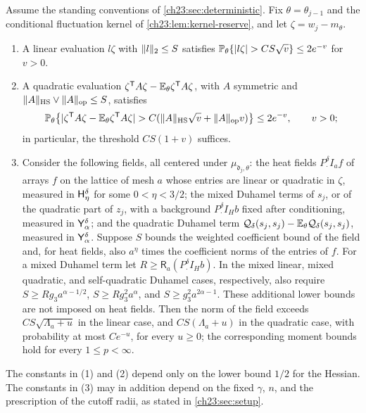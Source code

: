 \begin{lemma}\label{ch23:lem:input-maxima}
Assume the standing conventions of \cref{ch23:sec:deterministic}. Fix $\theta=\theta_{j-1}$ and the conditional fluctuation kernel of \cref{ch23:lem:kernel-reserve}, and let $\zeta=w_j-m_\theta$.
\begin{enumerate}
\item A linear evaluation $l\zeta$ with $\lVert l\rVert_2\le S$ satisfies $\mathbb P_\theta\{\lvert l\zeta\rvert>CS\sqrt v\}\le2e^{-v}$ for $v>0$.
\item A quadratic evaluation $\zeta^{\mathsf T}A\zeta-\mathbb E_\theta\zeta^{\mathsf T}A\zeta$, with $A$ symmetric and $\lVert A\rVert_{\mathrm{HS}}\vee\lVert A\rVert_{\mathrm{op}}\le S$, satisfies
\[
 \mathbb P_\theta\bigl\{\lvert \zeta^{\mathsf T}A\zeta-\mathbb E_\theta\zeta^{\mathsf T}A\zeta\rvert>C(\lVert A\rVert_{\mathrm{HS}}\sqrt v+\lVert A\rVert_{\mathrm{op}}v)\bigr\}\le2e^{-v},\qquad v>0;
\]
in particular, the threshold $CS(1+v)$ suffices.
\item Consider the following fields, all centered under $\mu_{\mathfrak d_j,\theta}$: the heat fields $P_\cdot^\delta I_af$ of arrays $f$ on the lattice of mesh $a$ whose entries are linear or quadratic in $\zeta$, measured in $\mathsf H_{\eta}^{\delta}$ for some $0<\eta<3/2$; the mixed Duhamel terms of $s_j$, or of the quadratic part of $z_j$, with a background $P_\cdot^\delta I_Hb$ fixed after conditioning, measured in $\mathsf Y_{\alpha}^{\delta}$; and the quadratic Duhamel term $\mathcal Q_\delta(s_j,s_j)-\mathbb E_\theta\mathcal Q_\delta(s_j,s_j)$, measured in $\mathsf Y_{\alpha}^{\delta}$. Suppose $S$ bounds the weighted coefficient bound of the field and, for heat fields, also $a^\eta$ times the coefficient norms of the entries of $f$. For a mixed Duhamel term let $R\ge\mathsf R_a(P_\cdot^\delta I_Hb)$. In the mixed linear, mixed quadratic, and self-quadratic Duhamel cases, respectively, also require $S\ge Rg_3a^{\alpha-1/2}$, $S\ge Rg_3^2a^\alpha$, and $S\ge g_3^2a^{2\alpha-1}$. These additional lower bounds are not imposed on heat fields. Then the norm of the field exceeds $CS\sqrt{\Lambda_a+u}$ in the linear case, and $CS(\Lambda_a+u)$ in the quadratic case, with probability at most $Ce^{-u}$, for every $u\ge0$; the corresponding moment bounds hold for every $1\le p<\infty$.
\end{enumerate}
The constants in (1) and (2) depend only on the lower bound $1/2$ for the Hessian. The constants in (3) may in addition depend on the fixed $\gamma$, $n$, and the prescription of the cutoff radii, as stated in \cref{ch23:sec:setup}.
\end{lemma}


